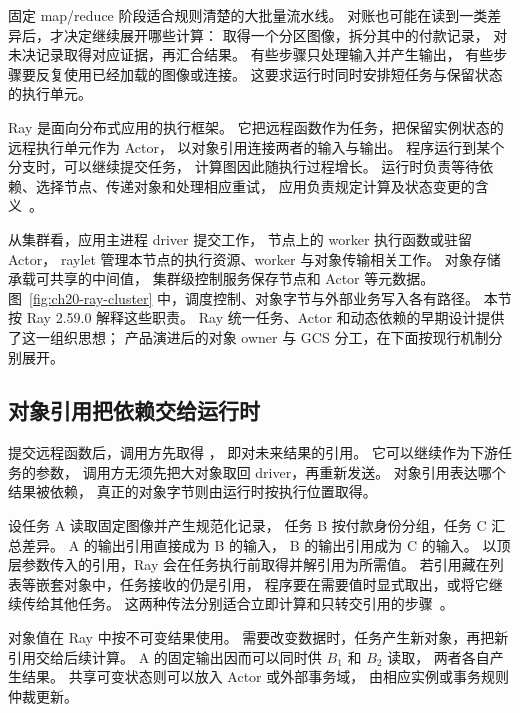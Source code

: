 固定 map/reduce 阶段适合规则清楚的大批量流水线。
对账也可能在读到一类差异后，才决定继续展开哪些计算：
取得一个分区图像，拆分其中的付款记录，
对未决记录取得对应证据，再汇合结果。
有些步骤只处理输入并产生输出，
有些步骤要反复使用已经加载的图像或连接。
这要求运行时同时安排短任务与保留状态的执行单元。

Ray 是面向分布式应用的执行框架。
它把远程函数作为任务，把保留实例状态的远程执行单元作为 Actor，
以对象引用连接两者的输入与输出。
程序运行到某个分支时，可以继续提交任务，
计算图因此随执行过程增长。
运行时负责等待依赖、选择节点、传递对象和处理相应重试，
应用负责规定计算及状态变更的含义~\cite{ray-dynamic-design,ray259-objects,ray259-actors}。

从集群看，应用主进程 driver 提交工作，
节点上的 worker 执行函数或驻留 Actor，
raylet 管理本节点的执行资源、worker 与对象传输相关工作。
对象存储承载可共享的中间值，
集群级控制服务保存节点和 Actor 等元数据。
图~\ref{fig:ch20-ray-cluster} 中，调度控制、对象字节与外部业务写入各有路径。
本节按 Ray 2.59.0 解释这些职责。
Ray 统一任务、Actor 和动态依赖的早期设计提供了这一组织思想；
产品演进后的对象 owner 与 GCS 分工，在下面按现行机制分别展开。


\subsection{对象引用把依赖交给运行时}

提交远程函数后，调用方先取得 ，
即对未来结果的引用。
它可以继续作为下游任务的参数，
调用方无须先把大对象取回 driver，再重新发送。
对象引用表达哪个结果被依赖，
真正的对象字节则由运行时按执行位置取得。

设任务 A 读取固定图像并产生规范化记录，
任务 B 按付款身份分组，任务 C 汇总差异。
A 的输出引用直接成为 B 的输入，
B 的输出引用成为 C 的输入。
以顶层参数传入的引用，Ray 会在任务执行前取得并解引用为所需值。
若引用藏在列表等嵌套对象中，任务接收的仍是引用，
程序要在需要值时显式取出，或将它继续传给其他任务。
这两种传法分别适合立即计算和只转交引用的步骤~\cite{ray259-objects}。


对象值在 Ray 中按不可变结果使用。
需要改变数据时，任务产生新对象，再把新引用交给后续计算。
A 的固定输出因而可以同时供 $B_1$ 和 $B_2$ 读取，
两者各自产生结果。
共享可变状态则可以放入 Actor 或外部事务域，
由相应实例或事务规则仲裁更新。

